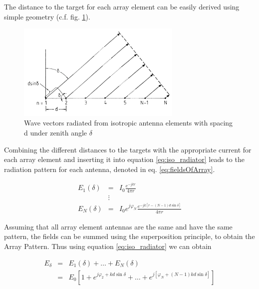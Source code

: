 The distance to the target for each array element can be easily derived using simple geometry (c.f. fig. \ref{fig:radiationPattern}).

\begin{figure}[!h]
\centering
	\includegraphics[width=0.7\textwidth]{images/PAradiationPattern}
	\caption{Wave vectors radiated from isotropic antenna elements with spacing d under zenith angle $\delta$ \citep[c.f.][Figure 10]{roettger1989instrumental}}
	\label{fig:radiationPattern}
\end{figure}

Combining the different distances to the targets with the appropriate current for each array element and inserting it into equation \ref{eq:iso_radiator} leads to the radiation pattern for each antenna, denoted in eq. \ref{eq:fieldsOfArray}. 

\begin{eqnarray}
	E_1(\delta) &=& I_0 \frac{e^{-jkr}}{4\pi r}\\
        &\vdots& \\
	E_N(\delta) &=& I_0 e^{j\varphi_{N}} \frac{e^{-jk[r - (N-1)d\sin\delta]}}{4\pi r}
	\label{eq:fieldsOfArray}
\end{eqnarray}

Assuming that all array element antennas are the same and have the same pattern, the fields can be summed using the superposition principle, to obtain the Array Pattern. Thus using equation \ref{eq:iso_radiator} we can obtain


\begin{eqnarray}
	E_\delta &=& E_1(\delta) + \dots + E_N(\delta) \\
	 &=& E_0 [1 + e^{j\varphi_2 + k d \sin \delta} + \dots + e^{j[\varphi_N + (N-1) k d \sin \delta]}]
\end{eqnarray}

